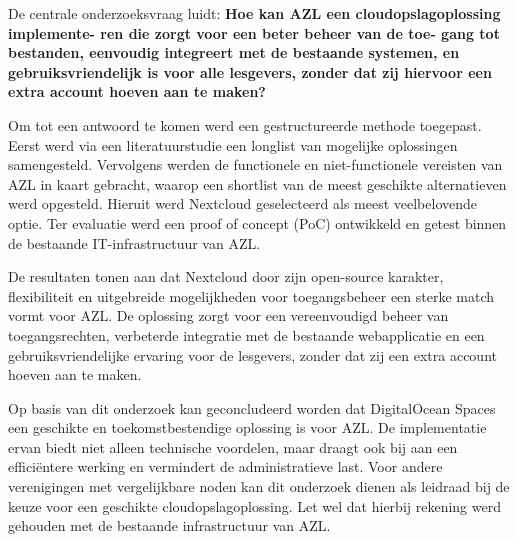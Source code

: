 De centrale onderzoeksvraag luidt: \textbf{Hoe kan AZL een cloudopslagoplossing implemente- ren die zorgt voor een beter beheer van de toe- gang tot bestanden, eenvoudig integreert met de bestaande systemen, en gebruiksvriendelijk is voor alle lesgevers, zonder dat zij hiervoor een extra account hoeven aan te maken?}

Om tot een antwoord te komen werd een gestructureerde methode toegepast. Eerst werd via een literatuurstudie een longlist van mogelijke oplossingen samengesteld. 
Vervolgens werden de functionele en niet-functionele vereisten van AZL in kaart gebracht, waarop een shortlist van de meest geschikte alternatieven werd opgesteld. 
Hieruit werd Nextcloud geselecteerd als meest veelbelovende optie. Ter evaluatie werd een proof of concept (PoC) ontwikkeld en getest binnen de 
bestaande IT-infrastructuur van AZL.

De resultaten tonen aan dat Nextcloud door zijn open-source karakter, flexibiliteit en uitgebreide mogelijkheden voor toegangsbeheer een sterke match vormt voor AZL. 
De oplossing zorgt voor een vereenvoudigd beheer van toegangsrechten, verbeterde integratie met de bestaande webapplicatie en een gebruiksvriendelijke ervaring voor 
de lesgevers, zonder dat zij een extra account hoeven aan te maken.

Op basis van dit onderzoek kan geconcludeerd worden dat DigitalOcean Spaces een geschikte en toekomstbestendige oplossing is voor AZL. De implementatie ervan biedt niet 
alleen technische voordelen, maar draagt ook bij aan een efficiëntere werking en vermindert de administratieve last. Voor andere verenigingen met vergelijkbare 
noden kan dit onderzoek dienen als leidraad bij de keuze voor een geschikte cloudopslagoplossing. Let wel dat hierbij rekening werd gehouden met de bestaande infrastructuur van AZL.